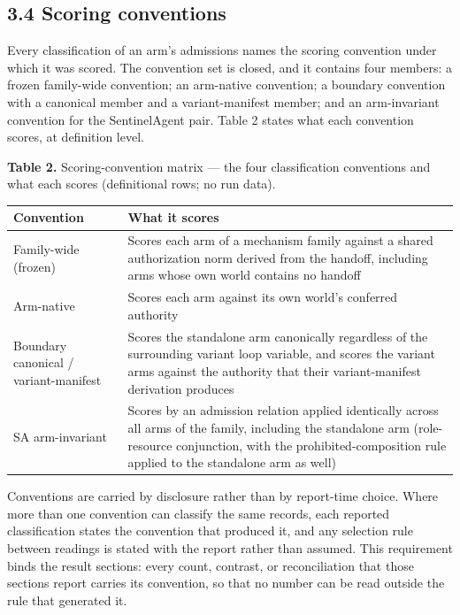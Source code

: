 \documentclass[
  10pt,
]{article}
\newcounter{none} %
\renewcommand{\_}{\origunderscore\allowbreak}
\begin{document}
\subsection{3.4 Scoring conventions}\label{scoring-conventions}

Every classification of an arm's admissions names the scoring convention
under which it was scored. The convention set is closed, and it contains
four members: a frozen family-wide convention; an arm-native convention;
a boundary convention with a canonical member and a variant-manifest
member; and an arm-invariant convention for the SentinelAgent pair.
Table 2 states what each convention scores, at definition level.

\textbf{Table 2.} Scoring-convention matrix --- the four classification
conventions and what each scores (definitional rows; no run data).

{\def\LTcaptype{none} %
\begin{longtable}[]{@{}
  >{\raggedright\arraybackslash}p{}
  >{\raggedright\arraybackslash}p{}@{}}
\toprule\noalign{}
\begin{minipage}[b]{\linewidth}\raggedright
Convention
\end{minipage} & \begin{minipage}[b]{\linewidth}\raggedright
What it scores
\end{minipage} \\
\midrule\noalign{}
\endhead
\bottomrule\noalign{}
\endlastfoot
Family-wide (frozen) & Scores each arm of a mechanism family against a
shared authorization norm derived from the handoff, including arms whose
own world contains no handoff \\
Arm-native & Scores each arm against its own world's conferred
authority \\
Boundary canonical / variant-manifest & Scores the standalone arm
canonically regardless of the surrounding variant loop variable, and
scores the variant arms against the authority that their
variant-manifest derivation produces \\
SA arm-invariant & Scores by an admission relation applied identically
across all arms of the family, including the standalone arm
(role-resource conjunction, with the prohibited-composition rule applied
to the standalone arm as well) \\
\end{longtable}
}

Conventions are carried by disclosure rather than by report-time choice.
Where more than one convention can classify the same records, each
reported classification states the convention that produced it, and any
selection rule between readings is stated with the report rather than
assumed. This requirement binds the result sections: every count,
contrast, or reconciliation that those sections report carries its
convention, so that no number can be read outside the rule that
generated it.
\end{document}
